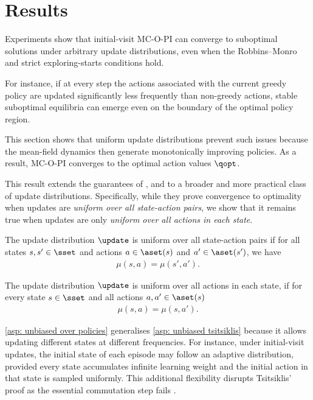 \section{Results}
\label{sec: results}




Experiments show that initial-visit MC-O-PI can converge to suboptimal solutions under arbitrary update distributions, even when the Robbins–Monro 
and strict exploring-starts conditions hold.


For instance, if at every step the actions associated with the current greedy policy are updated significantly less frequently than non-greedy actions, stable suboptimal equilibria can emerge even on the boundary of the optimal policy region.

This section shows that uniform update distributions prevent such issues because the mean-field dynamics then generate monotonically improving policies.
As a result, MC-O-PI converges to the optimal action values $\qopt$.

This result extends the guarantees of \citet{Tsitsiklis2002OnIteration}, \citet{Chen2018OnProblem} and \citet{Liu2021OnStarts} to a broader and more practical class of update distributions.
Specifically, while they prove convergence to optimality when updates are \textit{uniform over all state-action pairs}, we show that it remains true when updates are only \textit{uniform over all actions in each state}.

\begin{definition}
\label{asp: unbiased tsitsiklis}
The update distribution $\update$ is uniform over all state-action pairs
if for all states $s, s' \in \sset$ and actions $a \in \aset(s)$ and $a' \in \aset(s')$, we have
\begin{align*}
    \mu(s, a) = \mu(s', a') .
\end{align*}
\end{definition}

\begin{definition}
\label{asp: unbiased over policies}
The update distribution $\update$ is uniform over all actions in each state,
if for every state $s \in \sset$ and all actions $a, a' \in \aset(s)$
\begin{align*}
    \mu(s, a) = \mu(s, a') .
\end{align*}
\end{definition}

\autoref{asp: unbiased over policies} generalises \autoref{asp: unbiased tsitsiklis} because it allows updating different states at different frequencies.
For instance, under initial-visit updates, the initial state of each episode may follow an adaptive distribution, provided every state accumulates infinite learning weight and the initial action in that state is sampled uniformly.
This additional flexibility disrupts Tsitsiklis' proof as the essential commutation step fails \citep[p.~64]{Tsitsiklis2002OnIteration}.


